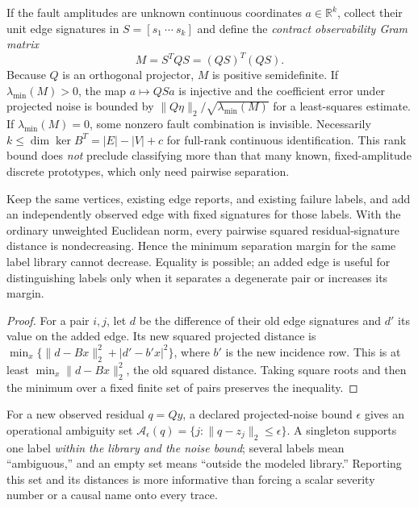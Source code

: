 \documentclass[11pt,a4paper]{article}
\begin{document}
If the fault amplitudes are unknown continuous coordinates $a\in\mathbb R^k$, collect their unit edge signatures in $S=[s_1\ \cdots\ s_k]$ and define the \emph{contract observability Gram matrix}
\begin{equation}\label{eq:gram}
M=S^TQS=(QS)^T(QS).
\end{equation}
Because $Q$ is an orthogonal projector, $M$ is positive semidefinite. If $\lambda_{\min}(M)>0$, the map $a\mapsto QSa$ is injective and the coefficient error under projected noise is bounded by $\|Q\eta\|_2/\sqrt{\lambda_{\min}(M)}$ for a least-squares estimate. If $\lambda_{\min}(M)=0$, some nonzero fault combination is invisible. Necessarily $k\le\dim\ker B^T=|E|-|V|+c$ for full-rank continuous identification. This rank bound does \emph{not} preclude classifying more than that many known, fixed-amplitude discrete prototypes, which only need pairwise separation.

\begin{theorem}\label{thm:edge-monotonicity}
Keep the same vertices, existing edge reports, and existing failure labels, and add an independently observed edge with fixed signatures for those labels. With the ordinary unweighted Euclidean norm, every pairwise squared residual-signature distance is nondecreasing. Hence the minimum separation margin for the same label library cannot decrease. Equality is possible; an added edge is useful for distinguishing labels only when it separates a degenerate pair or increases its margin.
\end{theorem}
\begin{proof}
For a pair $i,j$, let $d$ be the difference of their old edge signatures and $d'$ its value on the added edge. Its new squared projected distance is
$\min_x\{\|d-Bx\|_2^2+|d'-b'x|^2\}$, where $b'$ is the new incidence row. This is at least $\min_x\|d-Bx\|_2^2$, the old squared distance. Taking square roots and then the minimum over a fixed finite set of pairs preserves the inequality.
\end{proof}

For a new observed residual $q=Qy$, a declared projected-noise bound $\epsilon$ gives an operational ambiguity set $\mathcal A_\epsilon(q)=\{j:\|q-z_j\|_2\le\epsilon\}$. A singleton supports one label \emph{within the library and the noise bound}; several labels mean ``ambiguous,'' and an empty set means ``outside the modeled library.'' Reporting this set and its distances is more informative than forcing a scalar severity number or a causal name onto every trace.
\end{document}
